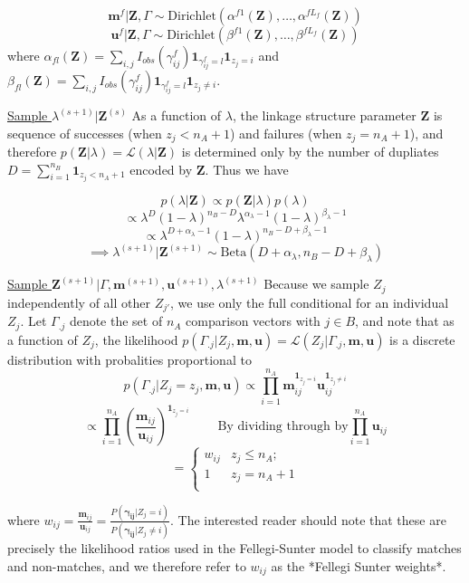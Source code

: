 \documentclass[12pt,a4paper]{article}\usepackage[]{graphicx}\usepackage[]{color}
\begin{document}
\begin{flushleft}
$$\mathbf{m}^f|\mathbf{Z}, \Gamma \sim \text{Dirichlet}(\alpha^{f1}(\mathbf{Z}), \ldots, \alpha^{fL_f}(\mathbf{Z}))$$
$$\mathbf{u}^f|\mathbf{Z}, \Gamma \sim \text{Dirichlet}(\beta^{f1}(\mathbf{Z}), \ldots, \beta^{fL_f}(\mathbf{Z}))$$
where $\alpha_{fl}(\mathbf{Z})= \sum_{i,j} I_{obs}(\gamma_{ij}^f)\mathbf{1}_{\gamma_{ij}^f = l} \mathbf{1}_{z_j = i}$ and $\beta_{fl}(\mathbf{Z})= \sum_{i,j} I_{obs}(\gamma_{ij}^f)\mathbf{1}_{\gamma_{ij}^f = l} \mathbf{1}_{z_j \neq i}$.

\underline{Sample $\lambda^{(s+1)}|\mathbf{Z}^{(s)}$} As a function of $\lambda$, the linkage structure parameter $\mathbf{Z}$ is sequence of successes (when $z_j < n_A + 1$) and failures (when $z_j = n_A + 1$), and therefore $p(\mathbf{Z}|\lambda) = \mathcal{L}(\lambda|\mathbf{Z})$ is  determined only by the number of dupliates $D = \sum_{i=1}^{n_B}\mathbf{1}_{z_j < n_A + 1}$ encoded by $\mathbf{Z}$. Thus we have

$$p(\lambda | \mathbf{Z}) \propto p(\mathbf{Z}|\lambda)p(\lambda)$$
$$\propto \lambda^D (1-\lambda)^{n_B - D} \lambda^{\alpha_{\lambda} -1} (1-\lambda)^{\beta_{\lambda} -1}$$
$$ \propto \lambda^{D + \alpha_{\lambda} - 1} (1-\lambda)^{n_B - D + \beta_{\lambda} -1}$$
$$\implies \lambda^{(s+1)}|\mathbf{Z}^{(s+1)} \sim \text{Beta}(D + \alpha_{\lambda}, n_B - D + \beta_{\lambda})$$

\underline{Sample $\mathbf{Z}^{(s+1)}|\Gamma, \mathbf{m}^{(s+1)}, \mathbf{u}^{(s+1)}, \lambda^{(s+1)}$} Because we sample $Z_j$ independently of all other $Z_{j'}$, we use only the full conditional for an individual $Z_j$. Let $\Gamma_{.j}$ denote the set of $n_A$ comparison vectors with $j \in B$, and note that as a function of $Z_j$, the likelihood $p(\Gamma_{.j}|Z_j, \mathbf{m}, \mathbf{u}) = \mathcal{L}(Z_j|\Gamma_{.j}, \mathbf{m}, \mathbf{u})$ is a discrete distribution with probalities proportional to
$$p(\Gamma_{.j}|Z_j = z_j, \mathbf{m}, \mathbf{u}) \propto \prod_{i=1}^{n_A}\mathbf{m}_{ij}^{\mathbf{1}_{z_j = i}}\mathbf{u}_{ij}^{\mathbf{1}_{z_j \neq i}}$$
$$\propto \prod_{i=1}^{n_A}\left(\frac{\mathbf{m}_{ij}}{\mathbf{u}_{ij}}\right)^{\mathbf{1}_{z_j = i}} \;\;\;\;\;\;\;\; \text{By dividing through by} \prod_{i = 1}^{n_A}\mathbf{u}_{ij}$$
$$=
\begin{cases}
    w_{ij}  & z_j \leq n_A; \\
    1 &  z_j  = n_A + 1 \\
\end{cases}$$

where $w_{ij} = \frac{\mathbf{m}_{ij}}{\mathbf{u}_{ij}} = \frac{P(\boldsymbol{\gamma_{ij}}|Z_j = i)}{P(\boldsymbol{\gamma_{ij}} |Z_j \neq i)}$. The interested reader should note that these are precisely the likelihood ratios used in the Fellegi-Sunter model to classify matches and non-matches, and we therefore refer to $w_{ij}$ as the *Fellegi Sunter weights*.


\end{flushleft}
\end{document}

